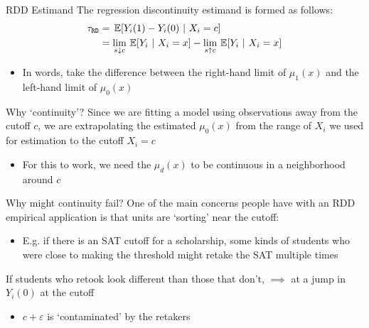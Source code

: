 \documentclass[aspectratio=169,t,11pt,table]{beamer}
\begin{document}
\begin{frame}{RDD Estimand}
  The \alert{regression discontinuity} estimand is formed as follows:
  \begin{align*}
    \tau_{\texttt{RD}} &= 
    \expec{Y_i(1) - Y_i(0)}{X_i = c} \\
    &= \lim_{s\downarrow c} \expec{Y_i}{X_i = x} - \lim_{s \uparrow c} \expec{Y_i}{X_i = x} 
  \end{align*}

  \begin{itemize}
    \item In words, take the difference between the right-hand limit of $\mu_1(x)$ and the left-hand limit of $\mu_0(x)$
  \end{itemize}
\end{frame}

\begin{frame}{Why `continuity'?}
  Since we are fitting a model using observations away from the cutoff $c$, we are \alert{extrapolating} the estimated $\mu_0(x)$ from the range of $X_i$ we used for estimation to the cutoff $X_i = c$
  \begin{itemize}
    \item For this to work, we need the $\mu_d(x)$ to be continuous in a neighborhood around $c$
  \end{itemize}
\end{frame}



\begin{frame}{Why might continuity fail?}{}
  One of the main concerns people have with an RDD empirical application is that units are `sorting' near the cutoff:
  \begin{itemize}
    \item E.g. if there is an SAT cutoff for a scholarship, some kinds of students who were close to making the threshold might retake the SAT multiple times
  \end{itemize}

  \bigskip
  If students who retook look different than those that don't, $\implies$ at a jump in $Y_{i}(0)$ at the cutoff
  \begin{itemize}
    \item $c + \varepsilon$ is `contaminated' by the retakers 
  \end{itemize}
\end{frame}
\end{document}
